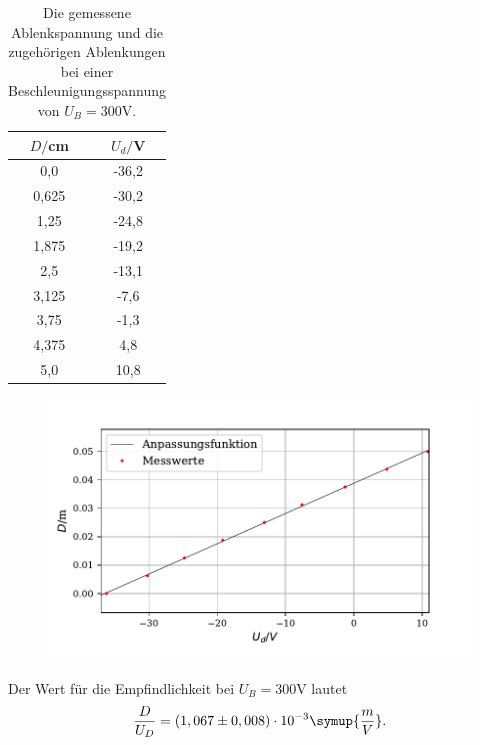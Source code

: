 \begin{table}[H]
  \centering
  \caption{Die gemessene Ablenkspannung und die zugehörigen Ablenkungen bei einer Beschleunigungsspannung von $U_B = 300 \si{\volt}$.}
  \label{tab:Parameter}
  \begin{tabular}{c c}
    \toprule
    $D/$cm& $U_d/$V \\
    \bottomrule
    0,0 & -36,2 \\
     0,625 & -30,2  \\
     1,25 & -24,8 \\
     1,875 & -19,2  \\
     2,5 & -13,1 \\
     3,125 & -7,6  \\
     3,75& -1,3 \\
     4,375 & 4,8  \\
     5,0 &  10,8 \\
     \bottomrule
  \end{tabular}
\end{table}

\begin{figure}[H]
  \centering
  \includegraphics{plot5.pdf}
  \caption{}
  \label{fig:plot}
\end{figure}

Der Wert für die Empfindlichkeit bei $U_B = 300 \si{\volt}$ lautet
\begin{align*}
\frac{D}{U_D} = (1,067 \pm 0,008) \cdot 10^{-3} \symup{\frac{m}{V}} .
\end{align*}

